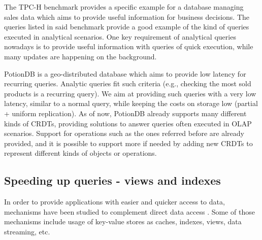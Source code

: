 The TPC-H benchmark \cite{tpch, dbtoaster, partView, lazyMaintenance} provides a specific example for a database managing sales data which aims to provide useful information for business decisions.
The queries listed in said benchmark provide a good example of the kind of queries executed in analytical scenarios.
One key requirement of analytical queries nowadays is to provide useful information with queries of quick execution, while many updates are happening on the background.

PotionDB is a geo-distributed database which aims to provide low latency for recurring queries.
Analytic queries fit such criteria (e.g., checking the most sold products is a recurring query).
We aim at providing such queries with a very low latency, similar to a normal query, while keeping the costs on storage low (partial + uniform replication).
As of now, PotionDB already supports many different kinds of CRDTs, providing solutions to answer queries often executed in OLAP scenarios.
Support for operations such as the ones referred before are already provided, and it is possible to support more if needed by adding new CRDTs to represent different kinds of objects or operations.
 





\subsection{Speeding up queries - views and indexes}

In order to provide applications with easier and quicker access to data, mechanisms have been studied to complement direct data access \cite{noria, dbtoaster, pequod, txcache, viewSelection, optIncMaintenance, effMaintenance, lazyMaintenance, genIndex, partIndex, dbproxy}. 
Some of those mechanisms include usage of key-value stores as caches, indexes, views, data streaming, etc.


